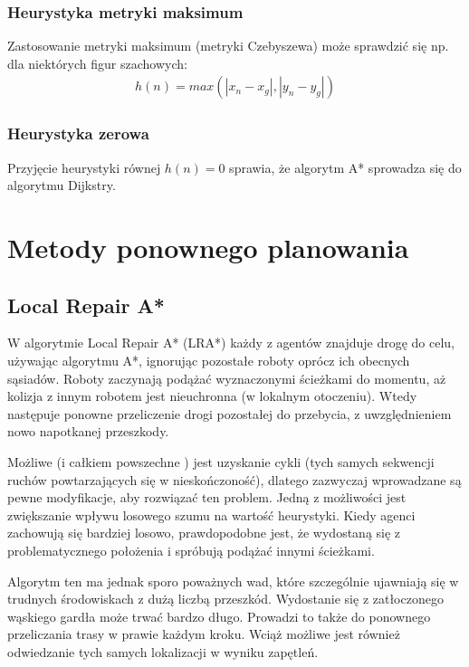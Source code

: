 \subsubsection{Heurystyka metryki maksimum}
Zastosowanie metryki maksimum (metryki Czebyszewa) może sprawdzić się np. dla niektórych figur szachowych:
\begin{gather}
 	h(n) = max(|x_n - x_g|, |y_n - y_g|)
 	\label{eq_astar_heu_czeb} 
\end{gather}


\subsubsection{Heurystyka zerowa}
Przyjęcie heurystyki równej $h(n) = 0$ sprawia, że algorytm A* sprowadza się do algorytmu Dijkstry.

\section{Metody ponownego planowania}
\subsection{Local Repair A*}
\label{ch:lra}
W algorytmie Local Repair A* (LRA*) każdy z agentów znajduje drogę do celu, używając algorytmu A*, ignorując pozostałe roboty oprócz ich obecnych sąsiadów. Roboty zaczynają podążać wyznaczonymi ścieżkami do momentu, aż kolizja z innym robotem jest nieuchronna (w lokalnym otoczeniu). Wtedy następuje ponowne przeliczenie drogi pozostałej do przebycia, z uwzględnieniem nowo napotkanej przeszkody.

Możliwe (i całkiem powszechne \cite{cooppath}) jest uzyskanie cykli (tych samych sekwencji ruchów powtarzających się w nieskończoność), dlatego zazwyczaj wprowadzane są pewne modyfikacje, aby rozwiązać ten problem. Jedną z możliwości jest zwiększanie wpływu losowego szumu na wartość heurystyki. Kiedy agenci zachowują się bardziej losowo, prawdopodobne jest, że wydostaną się z problematycznego położenia i spróbują podążać innymi ścieżkami.

Algorytm ten ma jednak sporo poważnych wad, które szczególnie ujawniają się w trudnych środowiskach z dużą liczbą przeszkód. Wydostanie się z zatłoczonego wąskiego gardła może trwać bardzo długo. Prowadzi to także do ponownego przeliczania trasy w prawie każdym kroku. Wciąż możliwe jest również odwiedzanie tych samych lokalizacji w wyniku zapętleń.

